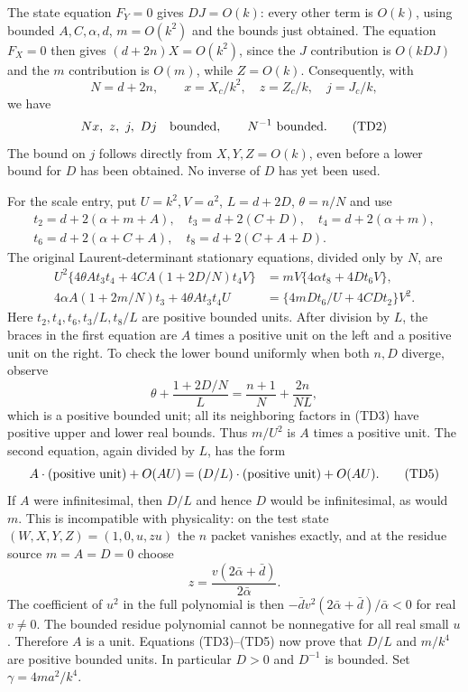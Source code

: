 The state equation $F_Y=0$ gives $DJ=O(k)$: every other term is
$O(k)$, using bounded $A,C,\alpha,d$, $m=O(k^2)$ and the bounds
just obtained. The equation $F_X=0$ then gives
$(d+2n)X=O(k^2)$, since the $J$ contribution is $O(kDJ)$ and the
$m$ contribution is $O(m)$, while $Z=O(k)$. Consequently, with
\[
 N=d+2n,\qquad x=X_c/k^2,\quad z=Z_c/k,\quad j=J_c/k,
\]
we have
\[
 Nx,\ z,\ j,\ Dj\quad\hbox{bounded},\qquad N^{-1}\ \hbox{bounded}.
                                                               \tag{TD2}
\]
The bound on $j$ follows directly from $X,Y,Z=O(k)$, even before a
lower bound for $D$ has been obtained. No inverse of $D$ has yet
been used.

For the scale entry, put $U=k^2,V=a^2$, $L=d+2D$,
$\theta=n/N$ and use
\[
\begin{gathered}
t_2=d+2(\alpha+m+A),\quad t_3=d+2(C+D),\quad
 t_4=d+2(\alpha+m),\\
t_6=d+2(\alpha+C+A),\quad t_8=d+2(C+A+D).
\end{gathered}
\]
The original Laurent-determinant stationary equations, divided only
by $N$, are
\[
\begin{split}
U^2\{4\theta A t_3t_4+4CA(1+2D/N)t_4V\}
 &=mV\{4\alpha t_8+4Dt_6V\},\\
4\alpha A(1+2m/N)t_3+4\theta A t_3t_4U
 &=\{4mDt_6/U+4CDt_2\}V^2.
\end{split}                       \tag{TD3}
\]
Here $t_2,t_4,t_6,t_3/L,t_8/L$ are positive bounded units.
After division by $L$, the braces in the first equation are
$A$ times a positive unit on the left and a positive unit on the
right. To check the lower bound uniformly when both $n,D$ diverge,
observe
\[
 \theta+\frac{1+2D/N}{L}
 =\frac{n+1}{N}+\frac{2n}{NL},                    \tag{TD4}
\]
which is a positive bounded unit; all its neighboring factors in
(TD3) have positive upper and lower real bounds. Thus
$m/U^2$ is $A$ times a positive unit. The second equation, again
divided by $L$, has the form
\[
 A\cdot(\hbox{positive unit})+O(AU)
    =(D/L)\cdot(\hbox{positive unit})+O(AU).       \tag{TD5}
\]
If $A$ were infinitesimal, then $D/L$ and hence $D$ would be
infinitesimal, as would $m$. This is incompatible with physicality:
on the test state $(W,X,Y,Z)=(1,0,u,zu)$ the $n$ packet vanishes
exactly, and at the residue source $m=A=D=0$ choose
\[
 z=\frac{v(2\bar\alpha+\bar d)}{2\bar\alpha}.
\]
The coefficient of $u^2$ in the full polynomial is then
$-\bar d v^2(2\bar\alpha+\bar d)/\bar\alpha<0$ for real $v\ne0$.
The bounded residue polynomial cannot be nonnegative for all real
small $u$. Therefore $A$ is a unit. Equations (TD3)--(TD5) now prove
that $D/L$ and $m/k^4$ are positive bounded units. In particular
$D>0$ and $D^{-1}$ is bounded. Set $\gamma=4ma^2/k^4$.

